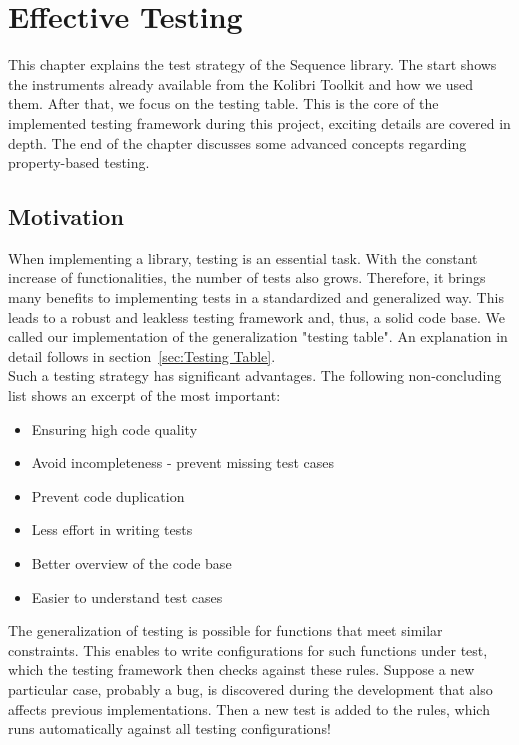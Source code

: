 \chapter{Effective Testing}
\label{chap:Effective_Testing}
This chapter explains the test strategy of the Sequence library. The start
shows the instruments already available from the Kolibri Toolkit and
how we used them. After that, we focus on the testing table. 
This is the core of the implemented testing framework during this project,
exciting details are covered in depth. The end of the chapter discusses some
advanced concepts regarding property-based testing.

\section{Motivation}
\label{sec:Motivation}
When implementing a library, testing is an essential task. With the constant
increase of functionalities, the number of tests also grows. Therefore, it
brings many benefits to implementing tests in a standardized and generalized
way. This leads to a robust and leakless testing framework and, thus, a solid
code base. We called our implementation of the generalization "testing table".
An explanation in detail follows in section~\ref{sec:Testing Table}. \\
Such a testing strategy has significant advantages. The following
non-concluding list shows an excerpt of the most important:

\begin{itemize}
  \item{Ensuring high code quality}
  \item{Avoid incompleteness - prevent missing test cases}
  \item{Prevent code duplication}
  \item{Less effort in writing tests}
  \item{Better overview of the code base}
  \item{Easier to understand test cases}
\end{itemize}

The generalization of testing is possible for functions that meet similar
constraints. This enables to write configurations for such functions under
test, which the testing framework then checks against these rules. Suppose a
new particular case, probably a bug, is discovered during the development that
also affects previous implementations. Then a new test is added to the rules,
which runs automatically against all testing configurations!

